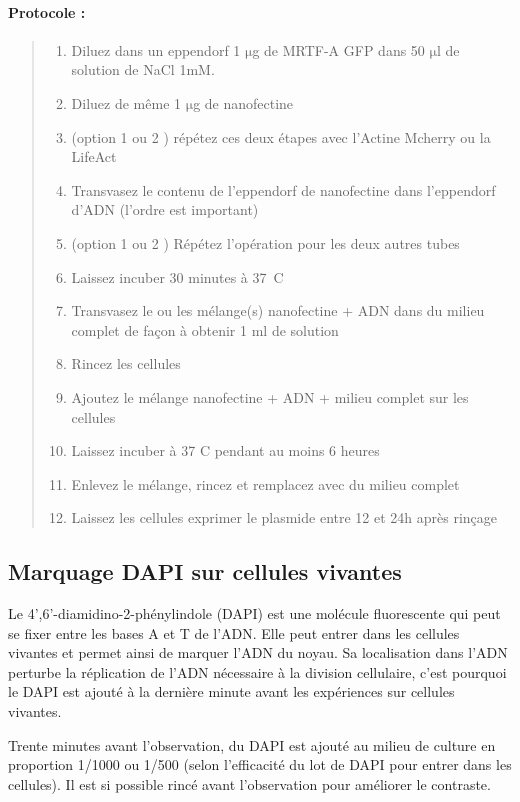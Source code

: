 \documentclass{report}
\newcommand{\micro}{$\mathrm{\mu}$}
\begin{document}
\paragraph{Protocole : }
\begin{quote}
\begin{enumerate}
	\item Diluez dans un eppendorf 1 \micro g de MRTF-A GFP dans 50 \micro l de solution de NaCl 1mM. 
	\item Diluez de même 1 \micro g de nanofectine
	\item (option 1 ou 2 ) répétez ces deux étapes avec l'Actine Mcherry ou la LifeAct
	\item Transvasez le contenu de l'eppendorf de nanofectine dans l'eppendorf d'ADN (l'ordre est important)
	\item (option 1 ou 2 ) Répétez l'opération pour les deux autres tubes
	\item Laissez incuber 30 minutes à 37~\degres C 
	\item Transvasez le ou les mélange(s) nanofectine + ADN dans du milieu complet de façon à obtenir 1  ml de solution
	\item Rincez les cellules
	\item Ajoutez le mélange nanofectine + ADN + milieu complet sur les cellules
	\item Laissez incuber à 37 \degres C pendant au moins 6 heures
	\item Enlevez le mélange, rincez et remplacez avec du milieu complet
	\item Laissez les cellules exprimer le plasmide entre 12 et 24h après rinçage
\end{enumerate}
\end{quote}

	\subsection{Marquage DAPI sur cellules vivantes}
	
	Le  4',6'-diamidino-2-phénylindole (DAPI) est une molécule fluorescente qui peut se fixer entre les bases A et T de l'ADN. Elle peut entrer dans les cellules vivantes et permet ainsi de marquer l'ADN du noyau. Sa localisation dans l'ADN perturbe la réplication de l'ADN nécessaire à la division cellulaire, c'est pourquoi le DAPI est ajouté à la dernière minute avant les expériences sur cellules vivantes. 
	
	Trente minutes avant l'observation, du DAPI est ajouté au milieu de culture en proportion 1/1000 ou 1/500 (selon l'efficacité du lot de DAPI pour entrer dans les cellules). Il est si possible rincé avant l'observation pour améliorer le contraste. 
\end{document}
